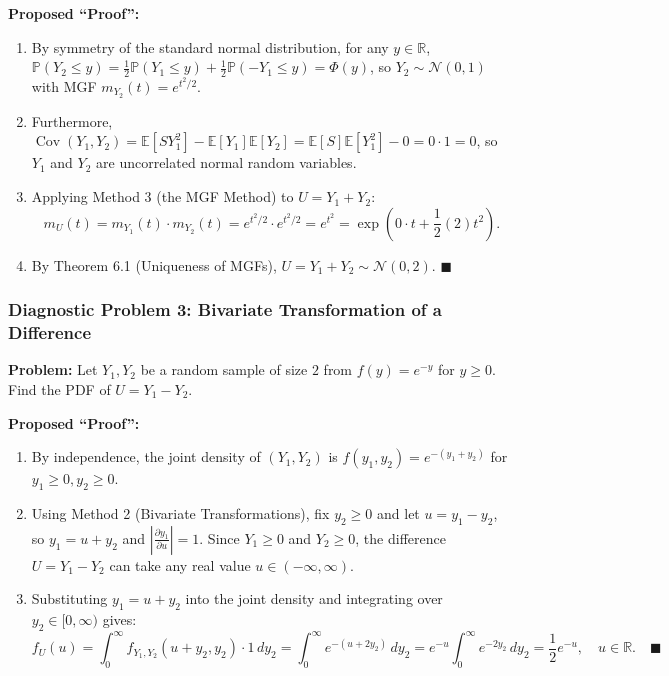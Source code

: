 \documentclass[11pt, letterpaper]{article}
\theoremstyle{definition}
\theoremstyle{remark}
\newcommand{\R}{\mathbb{R}}
\newcommand{\E}{\mathbb{E}}
\newcommand{\Prob}{\mathbb{P}}
\begin{document}
\begin{itemize}
\textbf{Proposed ``Proof'':}
\begin{enumerate}[label=\textbf{Line \arabic*:}]
    \item By symmetry of the standard normal distribution, for any $y \in \R$, $\Prob(Y_2 \le y) = \frac{1}{2}\Prob(Y_1 \le y) + \frac{1}{2}\Prob(-Y_1 \le y) = \Phi(y)$, so $Y_2 \sim \mathcal{N}(0, 1)$ with MGF $m_{Y_2}(t) = e^{t^2/2}$.
    \item Furthermore, $\operatorname{Cov}(Y_1, Y_2) = \E[S Y_1^2] - \E[Y_1]\E[Y_2] = \E[S]\E[Y_1^2] - 0 = 0 \cdot 1 = 0$, so $Y_1$ and $Y_2$ are uncorrelated normal random variables.
    \item Applying Method 3 (the MGF Method) to $U = Y_1 + Y_2$:
    \[
        m_U(t) = m_{Y_1}(t) \cdot m_{Y_2}(t) = e^{t^2/2} \cdot e^{t^2/2} = e^{t^2} = \exp\left(0\cdot t + \frac{1}{2}(2)t^2\right).
    \]
    \item By Theorem 6.1 (Uniqueness of MGFs), $U = Y_1 + Y_2 \sim \mathcal{N}(0, 2)$. $\blacksquare$
\end{enumerate}

\subsubsection*{Diagnostic Problem 3: Bivariate Transformation of a Difference}
\textbf{Problem:} Let $Y_1, Y_2$ be a random sample of size $2$ from $f(y) = e^{-y}$ for $y \ge 0$. Find the PDF of $U = Y_1 - Y_2$.

\textbf{Proposed ``Proof'':}
\begin{enumerate}[label=\textbf{Line \arabic*:}]
    \item By independence, the joint density of $(Y_1, Y_2)$ is $f(y_1, y_2) = e^{-(y_1 + y_2)}$ for $y_1 \ge 0, y_2 \ge 0$.
    \item Using Method 2 (Bivariate Transformations), fix $y_2 \ge 0$ and let $u = y_1 - y_2$, so $y_1 = u + y_2$ and $\left|\frac{\partial y_1}{\partial u}\right| = 1$. Since $Y_1 \ge 0$ and $Y_2 \ge 0$, the difference $U = Y_1 - Y_2$ can take any real value $u \in (-\infty, \infty)$.
    \item Substituting $y_1 = u + y_2$ into the joint density and integrating over $y_2 \in [0, \infty)$ gives:
    \[
        f_U(u) = \int_0^{\infty} f_{Y_1, Y_2}(u + y_2, y_2) \cdot 1 \, dy_2 = \int_0^{\infty} e^{-(u + 2y_2)} \, dy_2 = e^{-u} \int_0^{\infty} e^{-2y_2} \, dy_2 = \frac{1}{2} e^{-u}, \quad u \in \R. \quad \blacksquare
    \]
\end{enumerate}


\end{itemize}
\end{document}
